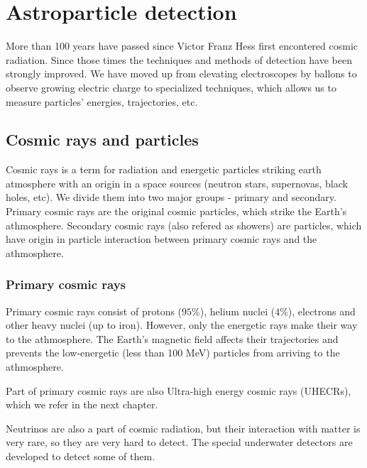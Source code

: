 
\chapter{Astroparticle detection}
More than 100 years have passed since Victor Franz Hess first encontered cosmic radiation. Since those times the techniques and methods of detection have been strongly improved. We have moved up from elevating electroscopes by ballons to observe growing electric charge to specialized techniques, which allows us to measure particles' energies, trajectories, etc.

\section{Cosmic rays and particles}
Cosmic rays is a term for radiation and energetic particles striking earth atmosphere with an origin in a space sources (neutron stars, supernovas, black holes, etc). We divide them into two major groups - primary and secondary. Primary cosmic rays are the original cosmic particles, which strike the Earth's athmosphere. Secondary cosmic rays (also refered as showers) are particles, which have origin in particle interaction between primary cosmic rays and the athmosphere.
\par
\subsection{Primary cosmic rays}
Primary cosmic rays consist of protons ($95 \%$), helium nuclei ($4 \%$), electrons and other heavy nuclei (up to iron). However, only the energetic rays make their way to the athmosphere. The Earth's magnetic field affects their trajectories and prevents the low-energetic (less than 100 MeV) particles from arriving to the athmosphere.
\par
Part of primary cosmic rays are also Ultra-high energy cosmic rays (UHECRs), which we refer in the next chapter.
\par 
Neutrinos are also a part of cosmic radiation, but their interaction with matter is very rare, so they are very hard to detect. The special underwater detectors are developed to detect some of them. 
